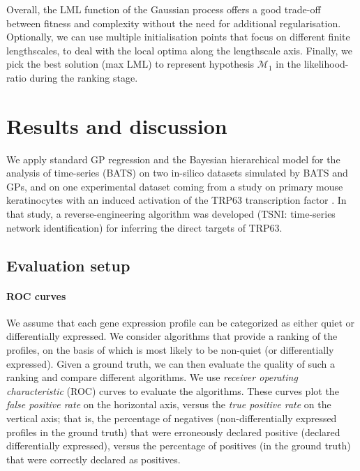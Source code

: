 	Overall, the LML function of the Gaussian process offers a good trade-off between fitness and complexity 
	without the need for additional regularisation. Optionally, we can use
	multiple initialisation points that focus on different finite lengthscales,
	to deal with the local optima along the lengthscale axis. Finally, we pick
	the best solution (max LML) to represent hypothesis $\mathcal{M}_1$ in
	the likelihood-ratio during the ranking stage.


  \section{Results and discussion}  \label{sec:chap2_results}
    We apply standard GP regression and the Bayesian hierarchical
    model for the analysis of time-series (BATS) on two in-silico datasets simulated
    by BATS and GPs, and on one experimental dataset coming from a study on primary
    mouse keratinocytes with an induced activation of the TRP63 transcription
    factor \citep{della2008direct}. In that study, a reverse-engineering algorithm was developed
    (TSNI: time-series network identification) for inferring the direct targets of TRP63.

    \subsection{Evaluation setup}
      \paragraph{ROC curves} We assume that each gene expression profile can be categorized as either quiet
      or differentially expressed. We consider algorithms that provide a ranking
      of the profiles, on the basis of which is most likely to be non-quiet (or differentially expressed).
      Given a ground truth, we can then evaluate the quality of such a ranking and
      compare different algorithms. We use \textit{receiver operating
      characteristic} (ROC) curves to evaluate the algorithms. These curves plot
      the \textit{false positive rate} on the horizontal axis, versus the
      \textit{true positive rate} on the vertical axis; that is, the
      percentage of negatives (non-differentially expressed profiles in the ground truth)
      that were erroneously declared positive (declared differentially expressed), versus the
      percentage of positives (in the ground truth) that were correctly declared as positives.

